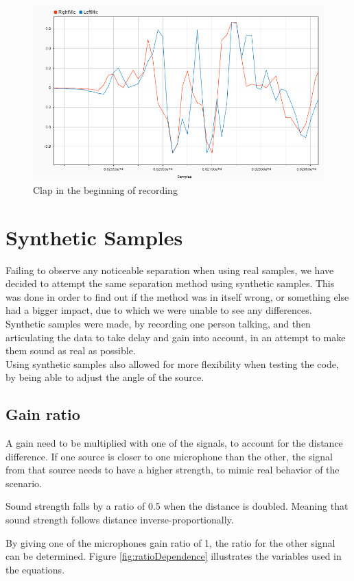 \begin{figure}[htp]
  \centering
  \includegraphics[width=0.7\linewidth]{Illustrations/clap.png}
  \caption{Clap in the beginning of recording}
  \label{fig:clap}
\end{figure}
\newpage

\section{Synthetic Samples}
Failing to observe any noticeable separation when using real samples, we have 
decided to attempt the same separation method using synthetic samples. This was 
done in order to find out if the method was in itself wrong, or something else had 
a bigger impact, due to which we were unable to see any differences. Synthetic 
samples were made, by recording one person talking, and then articulating the data 
to take delay and gain into account, in an attempt to make them sound as real as 
possible.\\


Using synthetic samples also allowed for more flexibility when testing the code, by 
being able to adjust the angle of the source. 

\subsection*{Gain ratio}
A gain need to be multiplied with one of the signals, to account for the distance 
difference. If one source is closer to one microphone than the other, the signal 
from that source needs to have a higher strength, to mimic real behavior of the 
scenario.

Sound strength falls by a ratio of 0.5 when the distance is doubled. Meaning that 
sound strength follows distance inverse-proportionally.
 
By giving one of the microphones gain ratio of 1, the ratio for the other signal 
can be determined. Figure \ref{fig:ratioDependence} illustrates the variables used 
in the equations.

